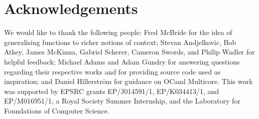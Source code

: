 \documentclass[11pt]{article}
\begin{document}


\section{Acknowledgements}

We would like to thank the following people: Fred McBride for the idea
of generalising functions to richer notions of context;
%
Stevan Andjelkovic, Bob Atkey, James McKinna, Gabriel Scherer, Cameron Swords,
and Philip Wadler for helpful feedback;
%
Michael Adams and Adam Gundry for answering questions regarding their
respective works and for providing source code used as inspiration;
%
and Daniel Hillerstr\"om for guidance on OCaml Multicore.
%
This work was supported by EPSRC grants EP/J014591/1, EP/K034413/1,
and EP/M016951/1, a Royal Society Summer Internship, and the
Laboratory for Foundations of Computer Science.










%
\end{document}
